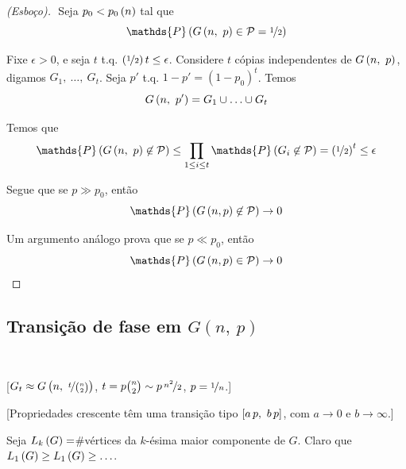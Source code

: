 \begin{proof}[(Esboço)]$ $\newline
  Seja $p_0<p_0\left(n\vphantom{1j}\right)$ tal que
  \vspace*{-\baselineskip}
  \[
    \mathds{P}\left(G\left(n,\ p\vphantom{1j}\right)\in\mathcal{P} = \nicefrac{1}{2}\vphantom{1j}\right)
  \]

  Fixe $\epsilon>0$, e seja $t$ t.q. $\left(\nicefrac{1}{2}\vphantom{1j}\right)t\leq\epsilon$. Considere $t$ cópias independentes de $G\left(n,\ p\vphantom{1j}\right)$, digamos $G_1,\ \ldots,\ G_t$. Seja $p'$ t.q. $1-p'=(1-p_0)^t$. Temos
  \[
    G\left(n,\ p'\vphantom{1j}\right) = G_1\cup\ldots\cup G_t
  \]

  Temos que
  \vspace*{-\baselineskip}
  \[
    \mathds{P}\left(G\left(n,\ p\vphantom{1j}\right)\not\in\mathcal{P}\vphantom{1j}\right)
      \leq \prod_{1\leq i\leq t} \mathds{P}\left(G_i\not\in\mathcal{P}\vphantom{1j}\right)
      = \left(\nicefrac{1}{2}\vphantom{1j}\right)^t
      \leq \epsilon
  \]

  Segue que se $p\gg p_0$, então
  \[
    \mathds{P}\left(G\left(n, p\vphantom{1j}\right)\not\in\mathcal{P}\vphantom{1j}\right) \rightarrow 0
  \]

  Um argumento análogo prova que se $p\ll p_0$, então
  \[
    \mathds{P}\left(G\left(n, p\vphantom{1j}\right)\in\mathcal{P}\vphantom{1j}\right) \rightarrow 0
  \]
\end{proof}

\clearpage
\subsection{Transição de fase em $G(n,\ p)$}$ $\newline

[$G_t\approx G\left(n,\ \nicefrac{t}{\binom{n}{2}}\vphantom{1j}\right)$, $t=p\binom{n}{2}\sim p\,\nicefrac{n^2}{2}$, $p=\nicefrac{1}{n}$.]

[Propriedades crescente têm uma transição tipo $\left[a\,p,\ b\,p\vphantom{1j}\right]$, com $a\rightarrow0$ e $b\rightarrow\infty$.]

Seja $L_k\left(G\vphantom{1j}\right)=$\#vértices da $k$-ésima maior componente de $G$. Claro que $L_1\left(G\vphantom{1j}\right)\geq L_1\left(G\vphantom{1j}\right)\geq\ldots$.

